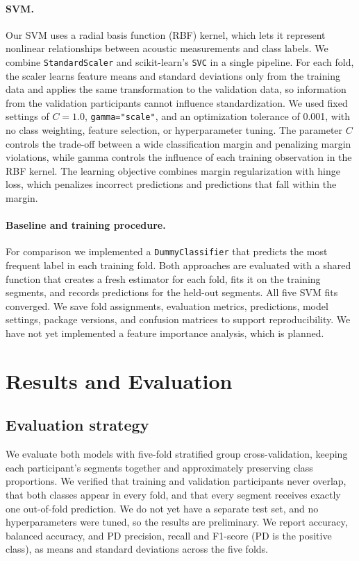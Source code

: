 \documentclass[11pt]{article}
\begin{document}
\paragraph{SVM.}
Our SVM uses a radial basis function (RBF) kernel, which lets it represent nonlinear
relationships between acoustic measurements and class labels. We combine
\texttt{StandardScaler} and scikit-learn's \texttt{SVC} in a single pipeline. For each
fold, the scaler learns feature means and standard deviations only from the training data
and applies the same transformation to the validation data, so information from the
validation participants cannot influence standardization. We used fixed settings of
$C=1.0$, \texttt{gamma="scale"}, and an optimization tolerance of 0.001, with no class
weighting, feature selection, or hyperparameter tuning. The parameter $C$ controls the
trade-off between a wide classification margin and penalizing margin violations, while
gamma controls the influence of each training observation in the RBF kernel. The learning
objective combines margin regularization with hinge loss, which penalizes incorrect
predictions and predictions that fall within the margin.

\paragraph{Baseline and training procedure.}
For comparison we implemented a \texttt{DummyClassifier} that predicts the most frequent
label in each training fold. Both approaches are evaluated with a shared function that
creates a fresh estimator for each fold, fits it on the training segments, and records
predictions for the held-out segments. All five SVM fits converged. We save fold
assignments, evaluation metrics, predictions, model settings, package versions, and
confusion matrices to support reproducibility. We have not yet implemented a feature
importance analysis, which is planned.

\section{Results and Evaluation}

\subsection{Evaluation strategy}
\label{sec:eval}

We evaluate both models with five-fold stratified group cross-validation, keeping each
participant's segments together and approximately preserving class proportions. We
verified that training and validation participants never overlap, that both classes appear
in every fold, and that every segment receives exactly one out-of-fold prediction. We do
not yet have a separate test set, and no hyperparameters were tuned, so the results are
preliminary. We report accuracy, balanced accuracy, and PD precision, recall and F1-score
(PD is the positive class), as means and standard deviations across the five folds.
\end{document}

